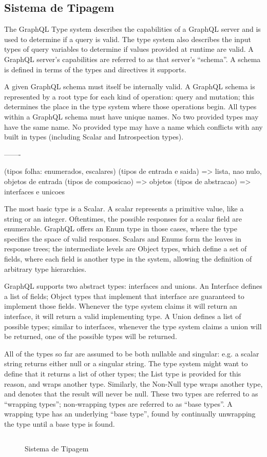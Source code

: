\subsection[Sistema de Tipagem]{Sistema de Tipagem}

The GraphQL Type system describes the capabilities of a GraphQL server and is used to determine if a query is valid. The type system also describes the input types of query variables to determine if values provided at runtime are valid. A GraphQL server’s capabilities are referred to as that server’s “schema”. A schema is defined in terms of the types and directives it supports.

A given GraphQL schema must itself be internally valid. A GraphQL schema is represented by a root type for each kind of operation: query and mutation; this determines the place in the type system where those operations begin. All types within a GraphQL schema must have unique names. No two provided types may have the same name. No provided type may have a name which conflicts with any built in types (including Scalar and Introspection types).

-------

(tipos folha: enumerados, escalares)
(tipos de entrada e saida) => lista, nao nulo, objetos de entrada
(tipos de composicao) => objetos
(tipos de abstracao) => interfaces e unicoes

The most basic type is a Scalar. A scalar represents a primitive value, like a string or an integer. Oftentimes, the possible responses for a scalar field are enumerable. GraphQL offers an Enum type in those cases, where the type specifies the space of valid responses. Scalars and Enums form the leaves in response trees; the intermediate levels are Object types, which define a set of fields, where each field is another type in the system, allowing the definition of arbitrary type hierarchies.

GraphQL supports two abstract types: interfaces and unions. An Interface defines a list of fields; Object types that implement that interface are guaranteed to implement those fields. Whenever the type system claims it will return an interface, it will return a valid implementing type. A Union defines a list of possible types; similar to interfaces, whenever the type system claims a union will be returned, one of the possible types will be returned.

All of the types so far are assumed to be both nullable and singular: e.g. a scalar string returns either null or a singular string. The type system might want to define that it returns a list of other types; the List type is provided for this reason, and wraps another type. Similarly, the Non-Null type wraps another type, and denotes that the result will never be null. These two types are referred to as “wrapping types”; non‐wrapping types are referred to as “base types”. A wrapping type has an underlying “base type”, found by continually unwrapping the type until a base type is found.

\begin{figure}[H]
  \centering
  \inputminted[frame=single,framesep=10pt]{javascript}{anexos/graphql-type-system.graphql}
  \caption{Sistema de Tipagem}
\end{figure}
